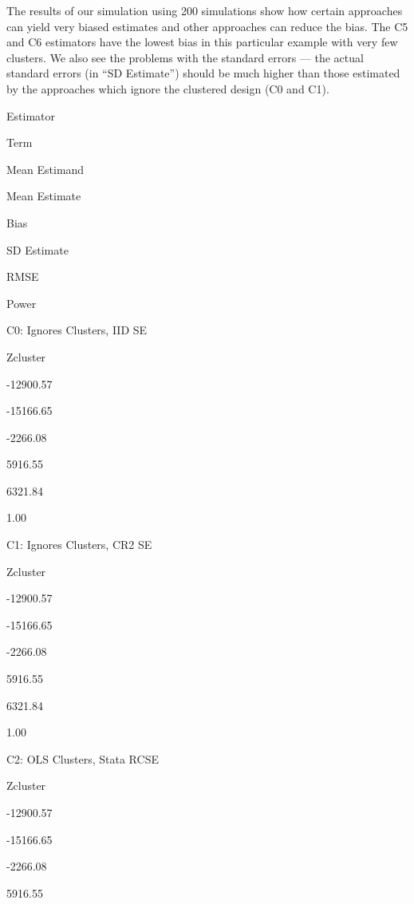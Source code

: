 \documentclass[
  12pt,
]{book}
\newenvironment{Shaded}{\begin{snugshade}}{\end{snugshade}}
\newcommand{\CommentTok}[1]{\textcolor[rgb]{0.56,0.35,0.01}{\textit{#1}}}
\newcommand{\KeywordTok}[1]{\textcolor[rgb]{0.13,0.29,0.53}{\textbf{#1}}}
\newcommand{\NormalTok}[1]{#1}
\theoremstyle{definition}
\theoremstyle{definition}
\theoremstyle{definition}
\theoremstyle{remark}
\begin{document}
The results of our simulation using 200 simulations show how certain
approaches can yield very biased estimates and other approaches can
reduce the bias. The C5 and C6 estimators have the lowest bias in this
particular example with very few clusters. We also see the problems with
the standard errors --- the actual standard errors (in ``SD Estimate'')
should be much higher than those estimated by the approaches which
ignore the clustered design (C0 and C1).

\begin{Shaded}
\end{Shaded}

Estimator

Term

Mean Estimand

Mean Estimate

Bias

SD Estimate

RMSE

Power

C0: Ignores Clusters, IID SE

Zcluster

-12900.57

-15166.65

-2266.08

5916.55

6321.84

1.00

C1: Ignores Clusters, CR2 SE

Zcluster

-12900.57

-15166.65

-2266.08

5916.55

6321.84

1.00

C2: OLS Clusters, Stata RCSE

Zcluster

-12900.57

-15166.65

-2266.08

5916.55
\end{document}

